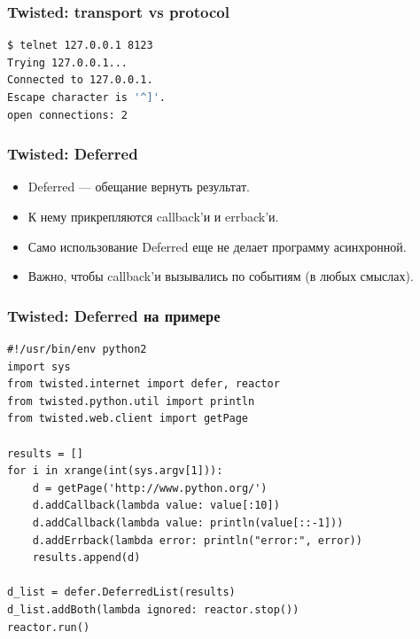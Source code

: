 \documentclass[aspectratio=169]{beamer}
\begin{document}
\begin{frame}[fragile]
  \frametitle{Twisted: transport vs protocol}
  \begin{lstlisting}[language=sh]
$ telnet 127.0.0.1 8123
Trying 127.0.0.1...
Connected to 127.0.0.1.
Escape character is '^]'.
open connections: 2
  \end{lstlisting}
\end{frame}


\begin{frame}
  \frametitle{Twisted: Deferred}
  \begin{itemize}
  \item Deferred --- обещание вернуть результат.
  \item К нему прикрепляются callback'и и errback'и.
  \item Само использование Deferred еще не делает программу асинхронной.
  \item Важно, чтобы callback'и вызывались по событиям (в любых смыслах).
  \end{itemize}
\end{frame}


\begin{frame}[fragile]
  \frametitle{Twisted: Deferred на примере}
  \begin{lstlisting}[caption=twisted\_example.py]
#!/usr/bin/env python2
import sys
from twisted.internet import defer, reactor
from twisted.python.util import println
from twisted.web.client import getPage

results = []
for i in xrange(int(sys.argv[1])):
    d = getPage('http://www.python.org/')
    d.addCallback(lambda value: value[:10])
    d.addCallback(lambda value: println(value[::-1]))
    d.addErrback(lambda error: println("error:", error))
    results.append(d)

d_list = defer.DeferredList(results)
d_list.addBoth(lambda ignored: reactor.stop())
reactor.run()
  \end{lstlisting}
\end{frame}
\end{document}
